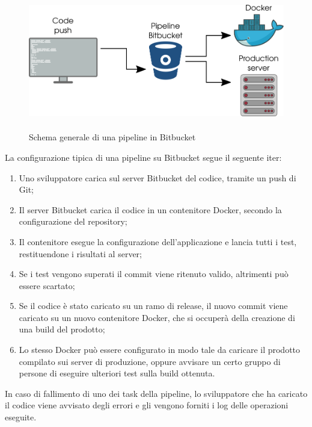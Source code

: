    \begin{figure}[H]
      \begin{center}
         \includegraphics[width=15cm,height=6cm,keepaspectratio]{immagini/bitbucket-pipeline}
      \end{center}
      \caption{Schema generale di una pipeline in Bitbucket}\label{pipelinebitbucket}
   \end{figure}
   La configurazione tipica di una pipeline su Bitbucket segue il seguente iter:
   \begin{enumerate}
      \item{Uno sviluppatore carica sul server Bitbucket del codice, tramite un push di Git;}
      \item{Il server Bitbucket carica il codice in un contenitore Docker, secondo la configurazione del repository;}
      \item{Il contenitore esegue la configurazione dell'applicazione e lancia tutti i test, restituendone i risultati al server;}
      \item{Se i test vengono superati il commit viene ritenuto valido, altrimenti può essere scartato;}
      \item{Se il codice è stato caricato su un ramo di release, il nuovo commit viene caricato su un nuovo contenitore Docker, che si occuperà della creazione di una build del prodotto;}
      \item{Lo stesso Docker può essere configurato in modo tale da caricare il prodotto compilato sui server di produzione, oppure avvisare un certo gruppo di persone di eseguire ulteriori test sulla build ottenuta.}
   \end{enumerate}
   In caso di fallimento di uno dei task della pipeline, lo sviluppatore che ha caricato il codice viene avvisato degli errori e gli vengono forniti i log delle operazioni eseguite.


